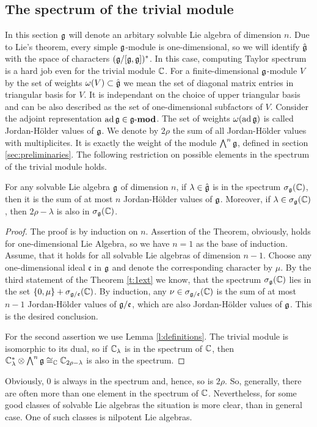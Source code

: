 \subsection{The spectrum of the trivial module}
In this section $\mathfrak{g}$ will denote an arbitary solvable Lie algebra of dimension $n$. Due to Lie's
theorem, every simple $\mathfrak{g}$-module is one-dimensional, so we will identify $\hat{\mathfrak{g}}$ with the
space of characters $(\mathfrak{g}/[\mathfrak{g},\mathfrak{g}])^*$. In this case, computing Taylor spectrum is a hard
job even for the trivial module $\mathbb{C}$. For a finite-dimensional $\mathfrak{g}$-module $V$ by the set of
weights $\omega(V) \subset \hat{\mathfrak{g}}$ we mean the set of diagonal matrix entries in triangular
basis for $V$. It is independant on the choice of upper triangular basis and can be also described
as the set of one-dimensional subfactors of $V$. Consider the adjoint representation $\operatorname{ad}\mathfrak{g} \in
\operatorname{\mathbf{\mathfrak{g}-mod}}$. The set of weights $\omega(\operatorname{ad}\mathfrak{g})$ is called Jordan-H{\"o}lder values of $\mathfrak{g}$.
We denote by $2\rho$ the sum of all Jordan-H{\"o}lder values with multiplicites. It is exactly the
weight of the module $\bigwedge^n\mathfrak{g}$, defined in section \ref{sec:preliminaries}.  The following
restriction on possible elements in the spectrum of the trivial module holds.
\begin{theorem} \label{t:jordanholder}
    For any solvable Lie algebra $\mathfrak{g}$ of dimension $n$, if $\lambda \in \hat{\mathfrak{g}}$ is in the
    spectrum $\sigma_{\mathfrak{g}}(\mathbb{C})$, then it is the sum of at most $n$ Jordan-H{\"o}lder values of
    $\mathfrak{g}$. Moreover, if $\lambda \in \sigma_{\mathfrak{g}}(\mathbb{C})$, then $2\rho - \lambda$ is also in
    $\sigma_{\mathfrak{g}}(\mathbb{C})$.
\end{theorem}
\begin{proof}
    The proof is by induction on $n$. Assertion of the Theorem, obviously, holds for
    one-dimensional Lie Algebra, so we have $n=1$ as the base of induction. Assume, that it holds
    for all solvable Lie algebras of dimension $n-1$. Choose any one-dimensional ideal
    $\mathfrak{c}$ in $\mathfrak{g}$ and denote the corresponding character by $\mu$. By the third
    statement of the Theorem \ref{t:1ext} we know, that the spectrum $\sigma_{\mathfrak{g}}(\mathbb{C})$ lies in
    the set $\{0, \mu\} + \sigma_{\mathfrak{g}/\mathfrak{e}}(\mathbb{C})$. By induction, any $\nu \in
    \sigma_{\mathfrak{g}/\mathfrak{e}}(\mathbb{C})$ is the sum of at most $n-1$ Jordan-H{\"o}lder values of
    $\mathfrak{g}/\mathfrak{e}$, which are also Jordan-H{\"o}lder values of $\mathfrak{g}$. This is the desired
    conclusion.

    For the second assertion we use Lemma \ref{l:definitions}. The trivial module is isomorphic to
    its dual, so if $\mathbb{C}_\lambda$ is in the spectrum of $\mathbb{C}$, then $\mathbb{C}_\lambda^* \otimes
    \bigwedge^n\mathfrak{g} \cong_{\mathbb{C}} \mathbb{C}_{2\rho - \lambda}$ is also in the spectrum.
\end{proof}
Obviously, $0$ is always in the spectrum and, hence, so is $2\rho$. So, generally, there are often
more than one element in the spectrum of $\mathbb{C}$. Nevertheless, for some good classes of solvable Lie
algebras the situation is more clear, than in general case. One of such classes is nilpotent Lie
algebras.

